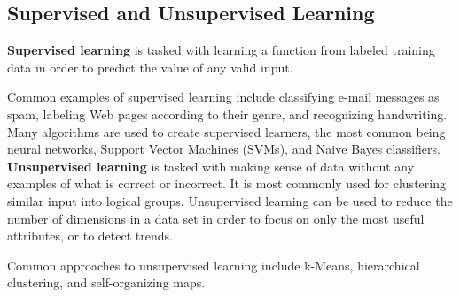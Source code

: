\documentclass[a4paper,12pt]{article}
\begin{document}
	

\subsection*{Supervised and Unsupervised Learning}
\textbf{Supervised learning} is tasked with learning a function from labeled training data in order to predict the value of any valid input. 

Common examples of supervised learning include classifying e-mail messages as spam, labeling Web pages according to their genre, and recognizing handwriting. Many algorithms are used to create supervised learners, the most common being neural networks, Support Vector Machines (SVMs), and Naive Bayes classifiers.
\\
\textbf{Unsupervised learning} is tasked with making sense of data without any examples of what is correct or incorrect. It is most commonly used for clustering similar input into logical groups. Unsupervised learning  can be used to reduce the number of dimensions in a data set in order to focus on only the most useful attributes, or to detect trends. 

Common approaches to unsupervised learning include k-Means, hierarchical clustering, and self-organizing maps.
\end{document}
